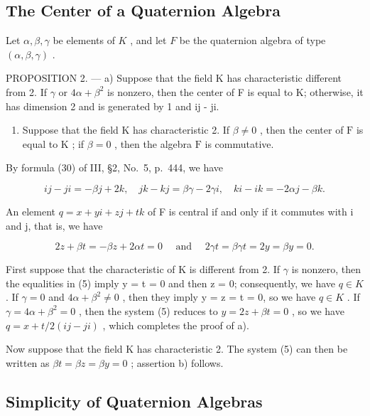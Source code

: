 \subsection{The Center of a Quaternion Algebra}

Let \(\alpha, \beta, \gamma\) be elements of \(K\) , and let \(F\) be the quaternion algebra of type \((\alpha, \beta, \gamma)\) .

PROPOSITION 2. --- a) Suppose that the field K has characteristic different from 2. If \(\gamma\) or \(4\alpha + \beta^{2}\) is nonzero, then the center of F is equal to K; otherwise, it has dimension 2 and is generated by 1 and ij - ji.

\begin{enumerate}
\def\labelenumi{\alph{enumi})}
\setcounter{enumi}{1}
\tightlist
\item
  Suppose that the field \(\mathrm{K}\) has characteristic 2. If \(\beta \neq 0\) , then the center of \(\mathrm{F}\) is equal to \(\mathrm{K}\) ; if \(\beta = 0\) , then the algebra \(\mathrm{F}\) is commutative.
\end{enumerate}

By formula (30) of III, §2, No.~5, p.~444, we have

\[
i j - j i = - \beta j + 2 k, \quad j k - k j = \beta \gamma - 2 \gamma i, \quad k i - i k = - 2 \alpha j - \beta k. \tag {4}
\]

An element \(q = x + yi + zj + tk\) of F is central if and only if it commutes with i and j, that is, we have

\[
2 z + \beta t = - \beta z + 2 \alpha t = 0 \quad \text { and } \quad 2 \gamma t = \beta \gamma t = 2 y = \beta y = 0.\tag{5}
\]

First suppose that the characteristic of K is different from 2. If \(\gamma\) is nonzero, then the equalities in (5) imply y = t = 0 and then z = 0; consequently, we have \(q \in K\) . If \(\gamma = 0\) and \(4\alpha + \beta^{2} \neq 0\) , then they imply y = z = t = 0, so we have \(q \in K\) . If \(\gamma = 4\alpha + \beta^{2} = 0\) , then the system (5) reduces to \(y = 2z + \beta t = 0\) , so we have \(q = x + t/2(ij - ji)\) , which completes the proof of a).

Now suppose that the field K has characteristic 2. The system (5) can then be written as \(\beta t = \beta z = \beta y = 0\) ; assertion b) follows.

\subsection{Simplicity of Quaternion Algebras}

